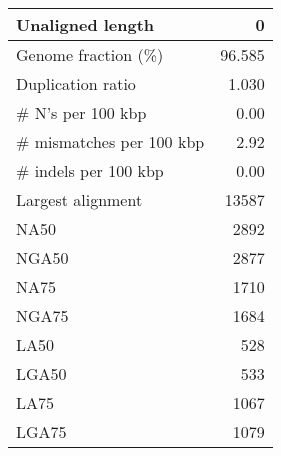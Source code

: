\documentclass[12pt,a4paper]{article}
\begin{document}
\begin{table}[ht]
\begin{center}
\begin{tabular}{|l*{1}{|r}|}
Unaligned length & 0 \\ \hline
Genome fraction (\%) & 96.585 \\ \hline
Duplication ratio & 1.030 \\ \hline
\# N's per 100 kbp & 0.00 \\ \hline
\# mismatches per 100 kbp & 2.92 \\ \hline
\# indels per 100 kbp & 0.00 \\ \hline
Largest alignment & 13587 \\ \hline
NA50 & 2892 \\ \hline
NGA50 & 2877 \\ \hline
NA75 & 1710 \\ \hline
NGA75 & 1684 \\ \hline
LA50 & 528 \\ \hline
LGA50 & 533 \\ \hline
LA75 & 1067 \\ \hline
LGA75 & 1079 \\ \hline
\end{tabular}
\end{center}
\end{table}
\end{document}
